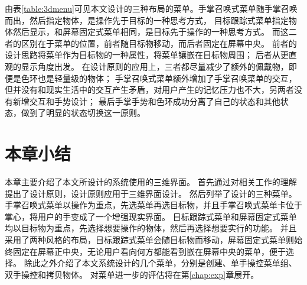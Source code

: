 由表\ref{table:3dmenu}可见本文设计的三种布局的菜单。手掌召唤式菜单随手掌召唤而出，然后指定物体，是操作先于目标的一种思考方式，
目标跟踪式菜单指定物体然后显示，和屏幕固定式菜单相同，是目标先于操作的一种思考方式。
而这二者的区别在于菜单的位置，前者随目标物移动，而后者固定在屏幕中央。
前者的设计思路将菜单作为目标物的一种属性，将菜单镶嵌在目标物周围；
后者从更直观的显示角度出发。
在设计原则的应用上，三者都尽量减少了额外的佩戴物，即便是色环也是轻量级的物体；
手掌召唤式菜单额外增加了手掌召唤菜单的交互，但并没有和现实生活中的交互产生矛盾，对用户产生的记忆压力也不大，另两者没有新增交互和手势设计；
最后手掌手势和色环成功分离了自己的状态和其他状态，做到了明显的状态切换这一原则。

\section{本章小结}
本章主要介绍了本文所设计的系统使用的三维界面。
首先通过对相关工作的理解提出了设计原则，设计原则应用于三维界面设计。
然后列举了设计的三种菜单。
手掌召唤式菜单以操作为重点，先选菜单再选目标物，并且手掌召唤式菜单卡位于掌心，将用户的手变成了一个增强现实界面。
目标跟踪式菜单和屏幕固定式菜单均以目标物为重点，先选择想要操作的物体，然后再选择想要实行的功能。
并且采用了两种风格的布局，目标跟踪式菜单会随目标物而移动，屏幕固定式菜单则始终固定在屏幕正中央，无论用户看向何方都能看到嵌在屏幕中央的菜单，便于选择。
除此之外介绍了本文系统设计的几个菜单，分别是创建、单手操控菜单组、双手操控和拷贝物体。
对菜单进一步的评估将在第\ref{chap:exp}章展开。